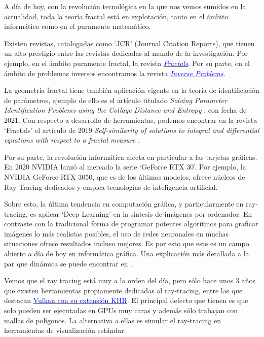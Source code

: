 A día de hoy, con la revolución tecnológica en la que nos vemos sumidos en la actualidad, toda la teoría fractal está en explotación, tanto en el ámbito informático como en el puramente matemático.

Existen revistas, catalogadas como `JCR' (Journal Citation Reports), que tienen un alto prestigio entre las revistas dedicadas al mundo de la investigación. Por ejemplo, en el ámbito puramente fractal, la revista \href{https://www.worldscientific.com/worldscinet/fractals}{\textcolor{blue}{\textit{Fractals}}}. Por su parte, en el ámbito de problemas inversos encontramos la revista \href{https://iopscience.iop.org/journal/0266-5611}{\textcolor{blue}{\textit{Inverse Problems}}}.

La geometría fractal tiene también aplicación vigente en la teoría de identificación de parámetros, ejemplo de ello es el artículo titulado \textit{Solving Parameter Identification Problems using the Collage Distance and Entropy} \cite{LaTorre}, con fecha de 2021. Con respecto a desarrollo de herramientas, podemos encontrar en la revista `Fractals' el artículo de 2019 \textit{Self-similarity of solutions to integral and differential equations with respect to a fractal measure} \cite{LaTorre2019}.

Por su parte, la revolución informática afecta en particular a las tarjetas gráficas.  En 2020 NVIDIA lanzó al mercado la serie `GeForce RTX 30'. Por ejemplo, la NVIDIA GeForce RTX 3050, que es de los últimos modelos, ofrece núcleos de Ray Tracing dedicados y emplea tecnologías de inteligencia artificial.

Sobre esto, la última tendencia en computación gráfica, y particularmente en ray-tracing, es aplicar `Deep Learning' en la síntesis de imágenes por ordenador. En contraste con la tradicional forma de programar potentes algoritmos para graficar imágenes lo más realistas posibles, el uso de redes neuronales en muchas situaciones ofrece resultados incluso mejores. Es por esto que este es un campo abierto a día de hoy en informática gráfica. Una explicación más detallada a la par que dinámica se puede encontrar en \cite{RT-AI}.

Vemos que el ray tracing está muy a la orden del día, pero sólo hace unos 3 años que existen herramientas propiamente dedicadas al ray-tracing, entre las que destacan \href{https://nvpro-samples.github.io/vk_raytracing_tutorial_KHR/}{\textcolor{blue}{Vulkan con su extensión KHR}}. El principal defecto que tienen es que solo pueden ser ejecutadas en GPUs muy caras y además sólo trabajan con mallas de polígonos. La alternativa a ellas es simular el ray-tracing en herramientas de visualización estándar.

